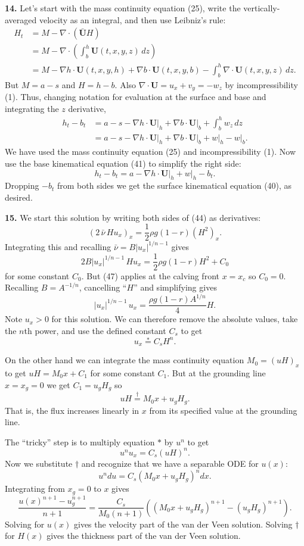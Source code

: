 \documentclass[10pt]{amsart}
\newcommand{\Div}{\nabla\cdot}
\newcommand{\grad}{\nabla}
\newcommand{\prob}[1]{\bigskip\noindent\large\textbf{#1.}\normalsize }
\begin{document}
\prob{14}  Let's start with the mass continuity equation (25), write the vertically-averaged velocity as an integral, and then use Leibniz's rule:
\begin{align*}
H_t &= M - \Div \left(\bar{\mathbf{U}} H \right) \\
    &= M - \Div \left(\int_b^h \mathbf{U}(t,x,y,z)\,dz\right) \\
    &= M - \grad h\cdot \mathbf{U}(t,x,y,h) + \grad b\cdot \mathbf{U}(t,x,y,b) - \int_b^h \Div \mathbf{U}(t,x,y,z)\,dz.
\end{align*}
But $M=a-s$ and $H=h-b$.  Also $\Div \mathbf{U} = u_x + v_y = - w_z$ by incompressibility (1).  Thus, changing notation for evaluation at the surface and base and integrating the $z$ derivative,
\begin{align*}
h_t - b_t &= a - s - \grad h\cdot \mathbf{U}\big|_h + \grad b\cdot \mathbf{U}\big|_b + \int_b^h w_z\,dz \\
    &= a - s - \grad h\cdot \mathbf{U}\big|_h + \grad b\cdot \mathbf{U}\big|_b + w\big|_h - w\big|_b.
\end{align*}
We have used the mass continuity equation (25) and incompressibility (1).  Now use the base kinematical equation (41) to simplify the right side:
  $$h_t - b_t = a - \grad h\cdot \mathbf{U}\big|_h + w\big|_h - b_t.$$
Dropping $-b_t$ from both sides we get the surface kinematical equation (40), as desired.

\prob{15}  We start this solution by writing both sides of (44) as derivatives:
    $$\left(2 \,\bar\nu\, H u_x\right)_x = \frac{1}{2} \rho g (1-r) (H^2)_x.$$
Integrating this and recalling $\bar\nu = B |u_x|^{1/n - 1}$ gives
    $$2 B |u_x|^{1/n - 1}\, H u_x = \frac{1}{2} \rho g (1-r) H^2 + C_0$$
for some constant $C_0$.  But (47) applies at the calving front $x=x_c$ so $C_0=0$.  Recalling $B=A^{-1/n}$, cancelling ``$H$'' and simplifying gives
    $$|u_x|^{1/n - 1}\, u_x = \frac{\rho g (1-r) A^{1/n}}{4} H.$$
Note $u_x>0$ for this solution.  We can therefore remove the absolute values, take the $n$th power, and use the defined constant $C_s$ to get
    $$u_x \stackrel{\ast}{=} C_s H^n.$$

On the other hand we can integrate the mass continuity equation $M_0=(uH)_x$ to get $uH = M_0 x + C_1$ for some constant $C_1$.  But at the grounding line $x=x_g=0$ we get $C_1 = u_g H_g$ so
    $$u H \stackrel{\dagger}{=} M_0 x + u_g H_g.$$
That is, the flux increases linearly in $x$ from its specified value at the grounding line.

The ``tricky'' step is to multiply equation $\ast$ by $u^n$ to get
    $$u^n u_x = C_s (uH)^n.$$
Now we substitute $\dagger$ and recognize that we have a separable ODE for $u(x)$:
    $$u^n du = C_s (M_0 x + u_g H_g)^n dx.$$
Integrating from $x_g=0$ to $x$ gives
    $$\frac{u(x)^{n+1}-u_g^{n+1}}{n+1} = \frac{C_s}{M_0 (n+1)} \left((M_0 x + u_g H_g)^{n+1} - (u_g H_g)^{n+1}\right).$$
Solving for $u(x)$ gives the velocity part of the van der Veen solution.  Solving $\dagger$ for $H(x)$ gives the thickness part of the van der Veen solution.
\end{document}
